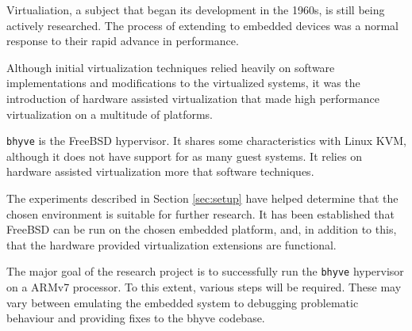 
Virtualiation, a subject that began its development in the 1960s, is still being actively researched. The process of extending to embedded devices was a normal response to their rapid advance in performance.

Although initial virtualization techniques relied heavily on software implementations and modifications to the virtualized systems, it was the introduction of hardware assisted virtualization that made high performance virtualization on a multitude of platforms.

\texttt{bhyve} is the FreeBSD hypervisor. It shares some characteristics with Linux KVM, although it does not have support for as many guest systems. It relies on hardware assisted virtualization more that software techniques.

The experiments described in Section \ref{sec:setup} have helped determine that the chosen environment is suitable for further research. It has been established that FreeBSD can be run on the chosen embedded platform, and, in addition to this, that the hardware provided virtualization extensions are functional.

The major goal of the research project is to successfully run the \texttt{bhyve} hypervisor on a ARMv7 processor. To this extent, various steps will be required. These may vary between emulating the embedded system to debugging problematic behaviour and providing fixes to the bhyve codebase.

 